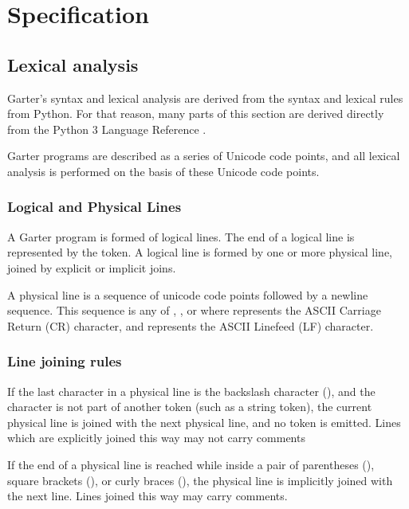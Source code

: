 \glsresetall %
\chapter{Specification}\label{ch:Specification}

\newcommand{\bs}[0]{\textbackslash}

\section{Lexical analysis}

Garter's syntax and lexical analysis are derived from the syntax and lexical rules
from Python. For that reason, many parts of this section are derived directly
from the Python 3 Language Reference \cite{pythonweb}.

Garter programs are described as a series of Unicode code points, and all lexical
analysis is performed on the basis of these Unicode code points.

\subsection{Logical and Physical Lines}

A Garter program is formed of logical lines. The end of a logical line is
represented by the  token. A logical line is formed by one or more
physical line, joined by explicit or implicit joins.

A physical line is a sequence of unicode code points followed by a newline
sequence. This sequence is any of \code{\bs r}, \code{\bs n}, or \code{\bs r\bs n} where \code{\bs r} represents the ASCII Carriage Return (CR) character, and \code{\bs n} represents the ASCII Linefeed (LF) character.

\subsection{Line joining rules}

If the last character in a physical line is the backslash character (\code{\bs}),
and the character is not part of another token (such as a string token), the
current physical line is joined with the next physical line, and no
 token is emitted. Lines which are explicitly joined this way may
not carry comments

If the end of a physical line is reached while inside a pair of parentheses
(\code{()}), square brackets (\code{[]}), or curly braces (\code{\{\}}), the
physical line is implicitly joined with the next line. Lines joined this way may
carry comments.

